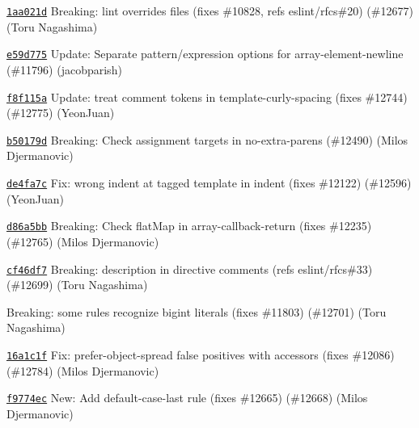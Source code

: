 \begin{DoxyItemize}
\item \href{https://github.com/eslint/eslint/commit/1aa021d77fdd2c68d7b7d2f4603252110c414b32}{\texttt{ {\ttfamily 1aa021d}}} Breaking\+: lint {\ttfamily overrides} files (fixes \#10828, refs eslint/rfcs\#20) (\#12677) (Toru Nagashima)
\item \href{https://github.com/eslint/eslint/commit/e59d77536bd8db57e8a75cd5245f6f320aa699f8}{\texttt{ {\ttfamily e59d775}}} Update\+: Separate pattern/expression options for array-\/element-\/newline (\#11796) (jacobparish)
\item \href{https://github.com/eslint/eslint/commit/f8f115af6e10539e6cad485588187cb11917f8c9}{\texttt{ {\ttfamily f8f115a}}} Update\+: treat comment tokens in template-\/curly-\/spacing (fixes \#12744) (\#12775) (Yeon\+Juan)
\item \href{https://github.com/eslint/eslint/commit/b50179def3fedbd95fdeab25e32c2511867eb760}{\texttt{ {\ttfamily b50179d}}} Breaking\+: Check assignment targets in no-\/extra-\/parens (\#12490) (Milos Djermanovic)
\item \href{https://github.com/eslint/eslint/commit/de4fa7c65c7befefa64d1605550267071ee56a5d}{\texttt{ {\ttfamily de4fa7c}}} Fix\+: wrong indent at tagged template in indent (fixes \#12122) (\#12596) (Yeon\+Juan)
\item \href{https://github.com/eslint/eslint/commit/d86a5bbb1987d858d4963f647b0af5c1fd924b4f}{\texttt{ {\ttfamily d86a5bb}}} Breaking\+: Check flat\+Map in array-\/callback-\/return (fixes \#12235) (\#12765) (Milos Djermanovic)
\item \href{https://github.com/eslint/eslint/commit/cf46df70158a4ed4c09d5c9d655c07dc6df3ff5e}{\texttt{ {\ttfamily cf46df7}}} Breaking\+: description in directive comments (refs eslint/rfcs\#33) (\#12699) (Toru Nagashima)
\item \href{https://github.com/eslint/eslint/commit/7350589a5bdfc9d75d1ff19364f476eec44c3911}{\texttt{ {}}} Breaking\+: some rules recognize bigint literals (fixes \#11803) (\#12701) (Toru Nagashima)
\item \href{https://github.com/eslint/eslint/commit/16a1c1f79bc0a4cc1c3a87e98d220041de88bb93}{\texttt{ {\ttfamily 16a1c1f}}} Fix\+: prefer-\/object-\/spread false positives with accessors (fixes \#12086) (\#12784) (Milos Djermanovic)
\item \href{https://github.com/eslint/eslint/commit/f9774ec11b0ebe63fb16a97b97890efb84699548}{\texttt{ {\ttfamily f9774ec}}} New\+: Add default-\/case-\/last rule (fixes \#12665) (\#12668) (Milos Djermanovic)

\end{DoxyItemize}

